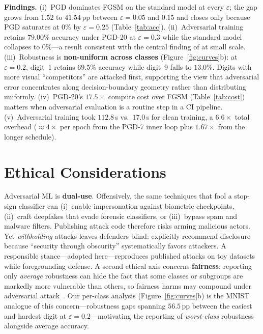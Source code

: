 \documentclass[10pt, twocolumn]{article}
\begin{document}
\textbf{Findings.} (i)~PGD dominates FGSM on the standard model at every $\varepsilon$; the gap grows from $1.52$ to $41.54$\,pp between $\varepsilon\!=\!0.05$ and $0.15$ and closes only because PGD saturates at $0\%$ by $\varepsilon\!=\!0.25$ (Table~\ref{tab:acc}). (ii)~Adversarial training retains $79.00\%$ accuracy under PGD-20 at $\varepsilon\!=\!0.3$ while the standard model collapses to $0\%$---a result consistent with the central finding of \citet{madry2018towards} at small scale. (iii)~Robustness is \textbf{non-uniform across classes} (Figure~\ref{fig:curves}b): at $\varepsilon\!=\!0.2$, digit~1 retains $69.5\%$ accuracy while digit~9 falls to $13.0\%$. Digits with more visual ``competitors'' are attacked first, supporting the view that adversarial error concentrates along decision-boundary geometry rather than distributing uniformly. (iv)~PGD-20's $17.5\times$ compute cost over FGSM (Table~\ref{tab:cost}) matters when adversarial evaluation is a routine step in a CI pipeline. (v)~Adversarial training took $112.8$\,s vs.\ $17.0$\,s for clean training, a $6.6\times$ total overhead ($\approx\!4\times$ per epoch from the PGD-7 inner loop plus $1.67\times$ from the longer schedule).

\section{Ethical Considerations}
\label{sec:ethics}

Adversarial ML is \textbf{dual-use}. Offensively, the same techniques that fool a stop-sign classifier can (i)~enable impersonation against biometric checkpoints, (ii)~craft deepfakes that evade forensic classifiers, or (iii)~bypass spam and malware filters. Publishing attack code therefore risks arming malicious actors. Yet \emph{withholding} attacks leaves defenders blind: \citet{nist2021aml} explicitly recommend disclosure because ``security through obscurity'' systematically favors attackers. A responsible stance---adopted here---reproduces published attacks on toy datasets while foregrounding defense. A second ethical axis concerns \textbf{fairness}: reporting only \emph{average} robustness can hide the fact that some classes or subgroups are markedly more vulnerable than others, so fairness harms may compound under adversarial attack~\citep{nist2021aml}. Our per-class analysis (Figure~\ref{fig:curves}b) is the MNIST analogue of this concern---robustness gaps spanning $56.5$\,pp between the easiest and hardest digit at $\varepsilon\!=\!0.2$---motivating the reporting of \emph{worst-class} robustness alongside average accuracy.
\end{document}
